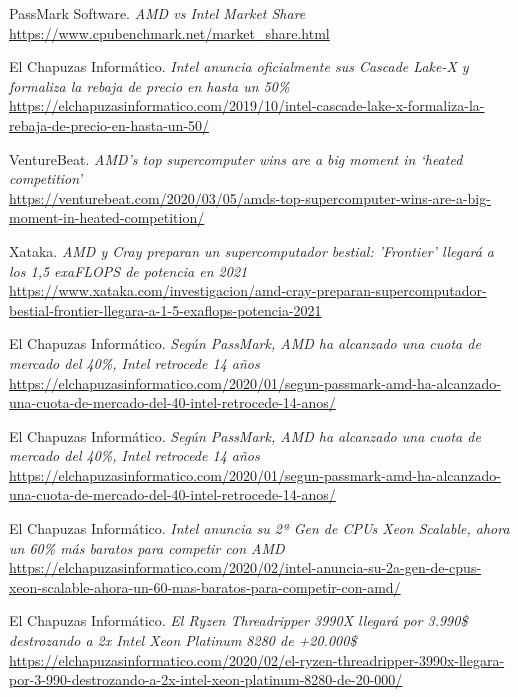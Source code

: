 \documentclass[11pt,a4paper]{article}
\begin{document}
\begin{thebibliography}{20}

PassMark Software. \textit{AMD vs Intel Market Share}
\\\url{https://www.cpubenchmark.net/market_share.html}

El Chapuzas Informático. \textit{Intel anuncia oficialmente sus Cascade Lake-X y formaliza la rebaja de precio en hasta un 50\%}
\\\url{https://elchapuzasinformatico.com/2019/10/intel-cascade-lake-x-formaliza-la-rebaja-de-precio-en-hasta-un-50/}

VentureBeat. \textit{AMD’s top supercomputer wins are a big moment in ‘heated competition’}
\\\url{https://venturebeat.com/2020/03/05/amds-top-supercomputer-wins-are-a-big-moment-in-heated-competition/}

Xataka. \textit{AMD y Cray preparan un supercomputador bestial: 'Frontier' llegará a los 1,5 exaFLOPS de potencia en 2021}
\\\url{https://www.xataka.com/investigacion/amd-cray-preparan-supercomputador-bestial-frontier-llegara-a-1-5-exaflops-potencia-2021}

El Chapuzas Informático. \textit{Según PassMark, AMD ha alcanzado una cuota de mercado del 40\%, Intel retrocede 14 años}
\\\url{https://elchapuzasinformatico.com/2020/01/segun-passmark-amd-ha-alcanzado-una-cuota-de-mercado-del-40-intel-retrocede-14-anos/}

El Chapuzas Informático. \textit{Según PassMark, AMD ha alcanzado una cuota de mercado del 40\%, Intel retrocede 14 años}
\\\url{https://elchapuzasinformatico.com/2020/01/segun-passmark-amd-ha-alcanzado-una-cuota-de-mercado-del-40-intel-retrocede-14-anos/}

El Chapuzas Informático. \textit{Intel anuncia su 2ª Gen de CPUs Xeon Scalable, ahora un 60\% más baratos para competir con AMD}
\\\url{https://elchapuzasinformatico.com/2020/02/intel-anuncia-su-2a-gen-de-cpus-xeon-scalable-ahora-un-60-mas-baratos-para-competir-con-amd/}

El Chapuzas Informático. \textit{El Ryzen Threadripper 3990X llegará por 3.990\$ destrozando a 2x Intel Xeon Platinum 8280 de +20.000\$}
\\\url{https://elchapuzasinformatico.com/2020/02/el-ryzen-threadripper-3990x-llegara-por-3-990-destrozando-a-2x-intel-xeon-platinum-8280-de-20-000/}


\end{thebibliography}
\end{document}
